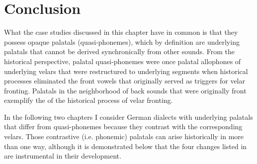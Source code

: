 \section{{Conclusion}}\label{sec:7.6}\largerpage

What the case studies discussed in this chapter have in common is that they possess opaque palatals (quasi-phonemes), which by definition are underlying palatals that cannot be derived synchronically from other sounds. From the historical perspective, palatal quasi-phonemes were once palatal allophones of underlying velars that were restructured to underlying segments when historical processes eliminated the front vowels that originally served as triggers for velar fronting. Palatals in the neighborhood of back sounds that were originally front exemplify the  of the historical process of velar fronting.

In the following two chapters I consider German dialects with underlying palatals that differ from quasi-phonemes because they contrast with the corresponding velars. Those contrastive (i.e. phonemic) palatals can arise historically in more than one way, although it is demonstrated below that the four changes listed in  are instrumental in their development.

